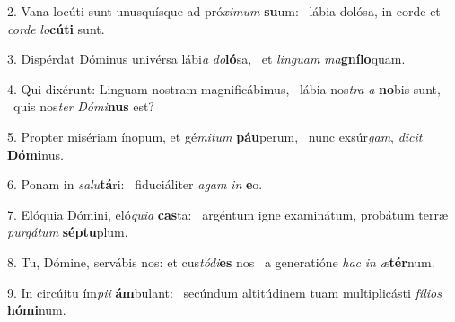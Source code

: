 2. Vana locúti sunt unusquísque ad pró\textit{xi}\textit{mum} \textbf{su}um: \ast\  lábia dolósa, in corde et \textit{cor}\textit{de} \textit{lo}\textbf{cú}\textbf{ti} sunt.\

3. Dispérdat Dóminus univérsa lábi\textit{a} \textit{do}\textbf{ló}sa, \ast\  et \textit{lin}\textit{guam} \textit{ma}\textbf{gní}\textbf{lo}quam.\

4. Qui dixérunt: Linguam nostram magnificábimus, \dag\  lábia nos\textit{tra} \textit{a} \textbf{no}bis sunt, \ast\  quis nos\textit{ter} \textit{Dó}\textit{mi}\textbf{nus} est?\

5. Propter misériam ínopum, et gé\textit{mi}\textit{tum} \textbf{páu}perum, \ast\  nunc exsúr\textit{gam}, \textit{di}\textit{cit} \textbf{Dó}\textbf{mi}nus.\

6. Ponam in \textit{sa}\textit{lu}\textbf{tá}ri: \ast\  fiduciáliter \textit{a}\textit{gam} \textit{in} \textbf{e}o.\

7. Elóquia Dómini, eló\textit{qui}\textit{a} \textbf{cas}ta: \ast\  argéntum igne examinátum, probátum terræ \textit{pur}\textit{gá}\textit{tum} \textbf{sép}\textbf{tu}plum.\

8. Tu, Dómine, servábis nos: et cus\textit{tó}\textit{di}\textbf{es} nos \ast\  a generatióne \textit{hac} \textit{in} \textit{æ}\textbf{tér}num.\

9. In circúitu ím\textit{pi}\textit{i} \textbf{ám}bulant: \ast\  secúndum altitúdinem tuam multiplicásti \textit{fí}\textit{li}\textit{os} \textbf{hó}\textbf{mi}num.\

